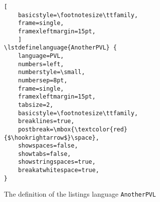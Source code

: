 \documentclass[a4paper]{scrartcl}
\begin{document}
\begin{figure}
\begin{lstlisting}[    
    basicstyle=\footnotesize\ttfamily,
    frame=single, 
	framexleftmargin=15pt,
	]
\lstdefinelanguage{AnotherPVL} {
    language=PVL,
    numbers=left, 
    numberstyle=\small, 
    numbersep=8pt, 
    frame=single, 
    framexleftmargin=15pt,
    tabsize=2,
    basicstyle=\footnotesize\ttfamily,
    breaklines=true,
    postbreak=\mbox{\textcolor{red}{$\hookrightarrow$}\space},
    showspaces=false,
    showtabs=false,
    showstringspaces=true,
    breakatwhitespace=true,
}
	\end{lstlisting}
	\caption{The definition of the listings language \texttt{AnotherPVL}}
	\label{fig:anotherpvl}
\end{figure}
\end{document}

